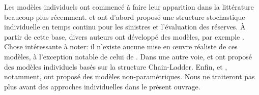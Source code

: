 Les modèles individuels ont commencé à faire leur apparition dans la
littérature beaucoup plus récemment. \citet{Arjas} et
\citet{Norberg,Norberg99} ont d'abord proposé une structure
stochastique individuelle en temps continu pour les sinistres et
l'évaluation des réserves. À partir de cette base, divers auteurs ont
développé des modèles, par exemple
\citet{Haastrup,Lars07,Zhao09,ZhaoIME2,AntonioPlat}. Chose
intéressante à noter: il n'existe aucune mise en œuvre réaliste de ces
modèles, à l'exception notable de celui de \citet{AntonioPlat}. Dans
une autre voie, \citet{PigAntDen2013} et \citet{PigAntDen2014} ont
proposé des modèles individuels basés sur la structure Chain-Ladder.
Enfin, \citet{Drieskens} et \citet{Rosenlund}, notamment, ont proposé
des modèles non-paramétriques. Nous ne traiteront pas plus avant des
approches individuelles dans le présent ouvrage.

